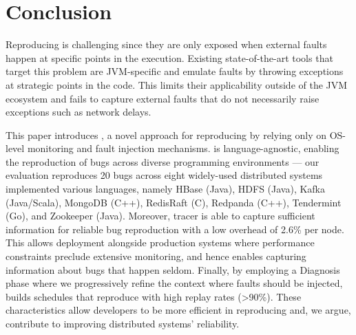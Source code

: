 \section{Conclusion}
Reproducing \efibshort is challenging since they are only exposed when external faults happen at specific points in the execution.
Existing state-of-the-art tools that target this problem are JVM-specific and emulate faults by throwing exceptions at strategic points in the code. 
This limits their applicability outside of the JVM ecosystem and fails to capture external faults that do not necessarily raise exceptions such as network delays.

This paper introduces \sys, a novel approach for reproducing \efib by relying only on OS-level monitoring and fault injection mechanisms.
\sys is language-agnostic, enabling the reproduction of bugs across diverse programming environments --- our evaluation reproduces 20 bugs across eight widely-used distributed systems implemented various languages, namely HBase (Java), HDFS (Java), Kafka (Java/Scala), MongoDB (C++), RedisRaft (C), Redpanda (C++), Tendermint (Go),  and Zookeeper (Java).
Moreover, \sys tracer is able to capture sufficient information for reliable bug reproduction with a low overhead of 2.6\% per node.
This allows deployment alongside production systems where performance constraints preclude extensive monitoring, and hence enables capturing information about bugs that happen seldom.
Finally, by employing a Diagnosis phase where we progressively refine the context where faults should be injected, \sys builds schedules that reproduce \efibshort with high replay rates (>90\%).
These characteristics allow developers to be more efficient in reproducing \efib and, we argue, contribute to improving distributed systems' reliability.

